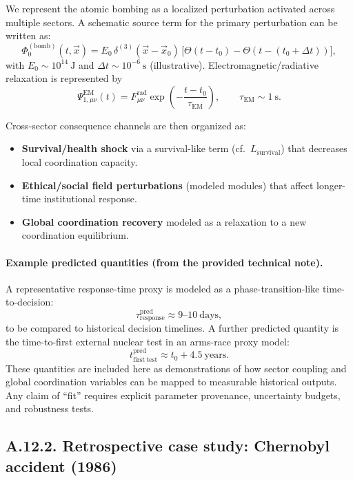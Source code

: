 \documentclass[13pt,a4paper]{article}
\begin{document}
	We represent the atomic bombing as a localized perturbation activated across multiple sectors. A schematic source term for the primary perturbation can be written as:
	$$
	\Phi_{0}^{(\mathrm{bomb})}(t,\vec{x}) = E_0\,\delta^{(3)}(\vec{x}-\vec{x}_0)\,\big[\Theta(t-t_0)-\Theta(t-(t_0+\Delta t))\big],
	$$
	with $E_0\sim 10^{14}\ \mathrm{J}$ and $\Delta t\sim 10^{-6}\ \mathrm{s}$ (illustrative). Electromagnetic/radiative relaxation is represented by
	$$
	\Psi_{1,\mu\nu}^{\mathrm{EM}}(t)=F_{\mu\nu}^{\mathrm{rad}}\exp\!\left(-\frac{t-t_0}{\tau_{\mathrm{EM}}}\right),\qquad \tau_{\mathrm{EM}}\sim 1\ \mathrm{s}.
	$$
	
	Cross-sector consequence channels are then organized as:
	\begin{itemize}[leftmargin=*]
		\item \textbf{Survival/health shock} via a survival-like term (cf.\ $L_{\mathrm{survival}}$) that decreases local coordination capacity.
		\item \textbf{Ethical/social field perturbations} (modeled modules) that affect longer-time institutional response.
		\item \textbf{Global coordination recovery} modeled as a relaxation to a new coordination equilibrium.
	\end{itemize}
	
	\paragraph{Example predicted quantities (from the provided technical note).}
	A representative response-time proxy is modeled as a phase-transition-like time-to-decision:
	$$
	\tau_{\mathrm{response}}^{\mathrm{pred}}\approx 9\text{--}10\ \mathrm{days},
	$$
	to be compared to historical decision timelines. A further predicted quantity is the time-to-first external nuclear test in an arms-race proxy model:
	$$
	t_{\mathrm{first\ test}}^{\mathrm{pred}} \approx t_0 + 4.5\ \mathrm{years}.
	$$
	These quantities are included here as demonstrations of how sector coupling and global coordination variables can be mapped to measurable historical outputs. Any claim of ``fit'' requires explicit parameter provenance, uncertainty budgets, and robustness tests.
	
	\subsection*{A.12.2. Retrospective case study: Chernobyl accident (1986)}
	
\end{document}
